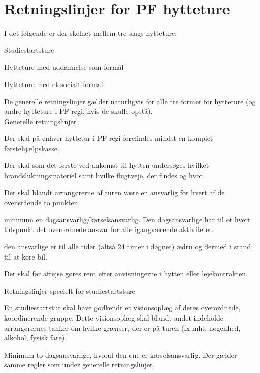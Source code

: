 \section{Retningslinjer for PF hytteture}
I det følgende er der skelnet mellem tre slags hytteture;
\begin{list}{•}
\item Studiestartsture
\item Hytteture med uddannelse som formål
\item Hytteture med et socialt formål
\end{list}

De generelle retningslinjer gælder naturligvis for alle tre former for hytteture (og andre hytteture i PF-regi, hvis de
skulle opstå).\\

Generelle retningslinjer
\begin{list}{•}
\item Der skal på enhver hyttetur i PF-regi forefindes mindst en komplet førstehjælpskasse.
\item Der skal som det første ved ankomst til hytten undersøges hvilket brandslukningsmateriel samt hvilke
flugtveje, der findes og hvor.
\item Der skal blandt arrangørerne af turen være en ansvarlig for hvert af de ovenstående to punkter.
\item minimum en dagsansvarlig/kørselsansvarlig. Den dagsansvarlige har til et hvert tidspunkt det overordnede
ansvar for alle igangværende aktiviteter.
\item den ansvarlige er til alle tider (altså 24 timer i døgnet) ædru og dermed i stand til at køre bil.
\item Der skal før afrejse gøres rent efter anvisningerne i hytten eller lejekontrakten.
\end{list}
Retningslinjer specielt for studiestartsture

\begin{list}{•}
\item En studiestartstur skal have godkendt et visionsoplæg af deres overordnede, koordinerende gruppe. Dette
visionsoplæg skal blandt andet indeholde arrangørernes tanker om hvilke grænser, der er på turen (fx mht.
nøgenhed, alkohol, fysisk fare).
\item Minimum to dagsansvarlige, hvoraf den ene er kørselsansvarlig. Der gælder samme regler som under generelle
retningslinjer.
\end{list}


